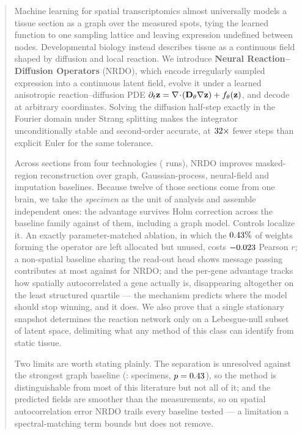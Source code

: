 \begin{abstract}
Machine learning for spatial transcriptomics almost universally models a tissue
section as a graph over the measured spots, tying the learned function to one
sampling lattice and leaving expression undefined between nodes. Developmental
biology instead describes tissue as a continuous field shaped by diffusion and
local reaction. We introduce \textbf{Neural Reaction--Diffusion Operators}
(NRDO), which encode irregularly sampled expression into a continuous latent
field, evolve it under a learned anisotropic reaction--diffusion PDE
$\partial_t \vz = \nabla\!\cdot\!(\mD_\theta \nabla \vz) + f_\theta(\vz)$, and
decode at arbitrary coordinates. Solving the diffusion half-step exactly in the
Fourier domain under Strang splitting makes the integrator unconditionally
stable and second-order accurate, at $\NumSpeedup\times$ fewer steps than
explicit Euler for the same tolerance.

Across \MSSections{} sections from four technologies (\MSRuns{} runs), NRDO
improves masked-region reconstruction over graph, Gaussian-process, neural-field
and imputation baselines. Because twelve of those sections come from one brain,
we take the \emph{specimen} as the unit of analysis and assemble \MSSpecimens{}
independent ones: the advantage survives Holm correction across the baseline
family against \MSSpecNSig{} of them, including a graph model. Controls
localize it. An exactly parameter-matched ablation, in which the
$\OpParamPct\%$ of weights forming the operator are left allocated but unused,
costs $\MatchedNoDynamicsDelta$ Pearson $r$; a non-spatial baseline sharing
the read-out head shows message passing contributes at most
\MSBestGraphOverAE{} against \MSNMOOverAE{} for NRDO; and the per-gene
advantage tracks how spatially autocorrelated a gene actually is, disappearing
altogether on the least structured quartile --- the mechanism predicts where the
model should stop winning, and it does. We also prove that a single
stationary snapshot determines the reaction network only on a Lebesgue-null
subset of latent space, delimiting what any method of this class can identify
from static tissue.

Two limits are worth stating plainly. The separation is unresolved against the
strongest graph baseline (\MSSpecGraphWorstModel{}: \MSSpecGraphWins{}
specimens, $p = \MSSpecGraphWorstP$), so the method is distinguishable from most
of this literature but not all of it; and the predicted fields are smoother than
the measurements, so on spatial autocorrelation error NRDO trails every baseline
tested --- a limitation a spectral-matching term bounds but does not remove.
\end{abstract}

